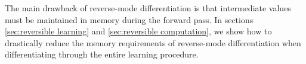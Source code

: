\documentclass{article}
\begin{document}
The main drawback of reverse-mode differentiation is that intermediate values
must be maintained in memory during the forward pass. In sections
\ref{sec:reversible learning} and \ref{sec:reversible computation}, we show how
to drastically reduce the memory requirements of reverse-mode differentiation
when differentiating through the entire learning procedure.



\end{document}
